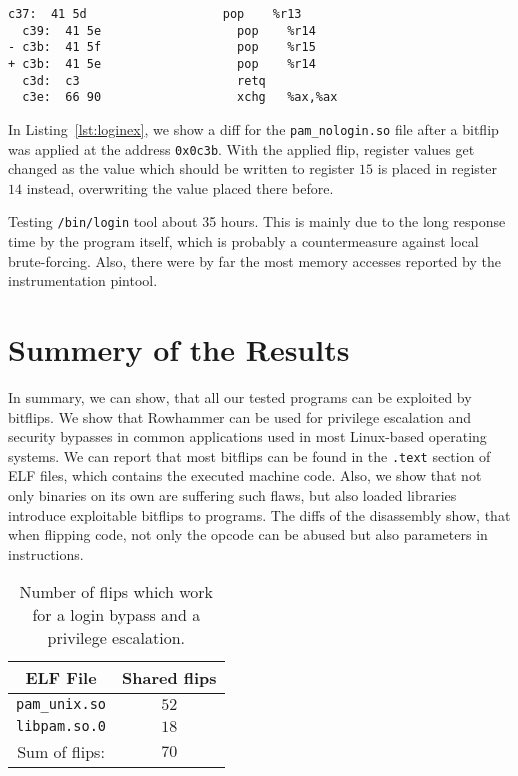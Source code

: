 \begin{minipage}{\linewidth}
\begin{lstlisting}[style=diff,
                   caption={Diff for a bitflip applied to the
\texttt{pam\_nologin.so} binary in order to bypass a credential check. The
pop to register $15$ gets exchanged with a pop to register $14$, therefore the
value of \texttt{r15} and \texttt{r14} are not as desired and hence the
execution path of \texttt{/bin/login} changes in a way the login
procedure succeeds.},
label=lst:loginex]
  c37:  41 5d                   pop    %r13
  c39:  41 5e                   pop    %r14
- c3b:  41 5f                   pop    %r15
+ c3b:  41 5e                   pop    %r14
  c3d:  c3                      retq
  c3e:  66 90                   xchg   %ax,%ax
\end{lstlisting}
\end{minipage}

In Listing~\ref{lst:loginex}, we show a diff for the \texttt{pam\_nologin.so}
file after a bitflip was applied at the address \texttt{0x0c3b}. With
the applied flip, register values get changed as the value which should be
written to register $15$ is placed in register $14$ instead, overwriting the
value placed there before.

Testing \texttt{/bin/login} tool about 35 hours. This is mainly due to the long
response time by the program itself, which is probably a countermeasure against
local brute-forcing. Also, there were by far the most memory accesses reported
by the instrumentation pintool.

\section{Summery of the Results}

In summary, we can show, that all our tested programs can be exploited by
bitflips. We show that Rowhammer can be used for privilege escalation and
security bypasses in common applications used in most Linux-based operating
systems. We can report that most bitflips can be found in the \texttt{.text}
section of ELF files, which contains the executed machine code. Also, we show
that not only binaries on its own are suffering such flaws, but also loaded
libraries introduce exploitable bitflips to programs. The diffs of the
disassembly show, that when flipping code, not only the opcode can be abused but
also parameters in instructions.

\begin{table}[!htb]
\centering
\begin{tabular}{c|c}
ELF File               & Shared flips \\ \hline
\texttt{pam\_unix.so} & $52$ \\
\texttt{libpam.so.0} & $18$ \\ \hline
Sum of flips:                 & $70$
\end{tabular}
\caption{Number of flips which work for a login bypass and a 
privilege escalation.}
\label{tab:loginsudo}
\end{table}


